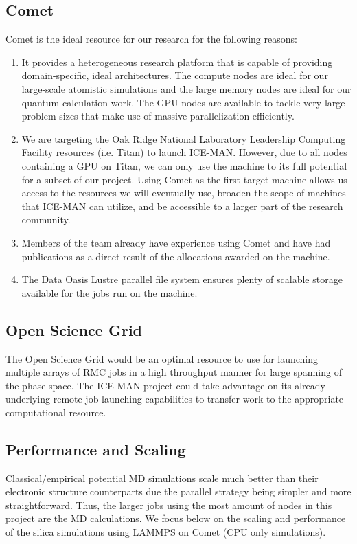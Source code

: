 \documentclass{proposalnsf}
\begin{document}
\newpage

\subsection*{Comet}
Comet is the ideal resource for our research for the following reasons:

\begin{enumerate}

\item It provides a heterogeneous research platform that is capable of providing domain-specific, ideal architectures. The compute nodes are ideal for our large-scale atomistic simulations and the large memory nodes are ideal for our quantum calculation work. The GPU nodes are available to tackle very large problem sizes that make use of massive parallelization efficiently.

\item We are targeting the Oak Ridge National Laboratory Leadership Computing Facility resources (i.e. Titan) to launch ICE-MAN. However, due to all nodes containing a GPU on Titan, we can only use the machine to its full potential for a subset of our project. Using Comet as the first target machine allows us access to the resources we will eventually use, broaden the scope of machines that ICE-MAN can utilize, and be accessible to a larger part of the research community.

\item Members of the team already have experience using Comet and have had publications as a direct result of the allocations awarded on the machine.

\item The Data Oasis Lustre parallel file system ensures plenty of scalable storage available for the jobs run on the machine.

\end{enumerate}

\subsection*{Open Science Grid}
The Open Science Grid would be an optimal resource to use for launching multiple arrays of RMC jobs in a high throughput manner for large spanning of the phase space. The ICE-MAN project could take advantage on its already-underlying remote job launching capabilities to transfer work to the appropriate computational resource.


\subsection*{Performance and Scaling}
Classical/empirical potential MD simulations scale much better than their electronic structure counterparts due the parallel strategy being simpler and more straightforward. Thus, the larger jobs using the most amount of nodes in this project are the MD calculations. We focus below on the scaling and performance of the silica simulations using LAMMPS on Comet (CPU only simulations).
\end{document}
